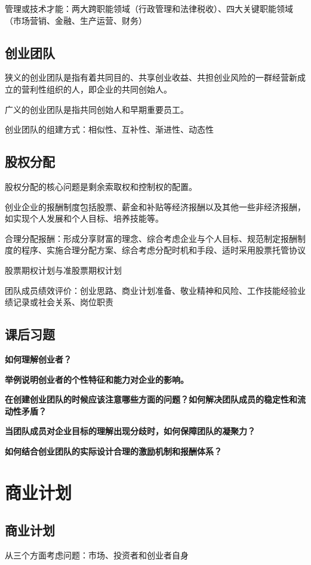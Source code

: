 \documentclass[a4paper, UTF8]{ctexart}
\begin{document}
		管理或技术才能：两大跨职能领域（行政管理和法律税收）、四大关键职能领域（市场营销、金融、生产运营、财务）

	\subsection{创业团队}
		狭义的创业团队是指有着共同目的、共享创业收益、共担创业风险的一群经营新成立的营利性组织的人，即企业的共同创始人。

		广义的创业团队是指共同创始人和早期重要员工。

		创业团队的组建方式：相似性、互补性、渐进性、动态性

	\subsection{股权分配}
		股权分配的核心问题是剩余索取权和控制权的配置。

		创业企业的报酬制度包括股票、薪金和补贴等经济报酬以及其他一些非经济报酬，如实现个人发展和个人目标、培养技能等。

		合理分配报酬：形成分享财富的理念、综合考虑企业与个人目标、规范制定报酬制度的程序、实施合理分配方案、综合考虑分配时机和手段、适时采用股票托管协议

		股票期权计划与准股票期权计划

		团队成员绩效评价：创业思路、商业计划准备、敬业精神和风险、工作技能经验业绩记录或社会关系、岗位职责

	\subsection{课后习题}
		\textbf{如何理解创业者？}

		\textbf{举例说明创业者的个性特征和能力对企业的影响。}

		\textbf{在创建创业团队的时候应该注意哪些方面的问题？如何解决团队成员的稳定性和流动性矛盾？}

		\textbf{当团队成员对企业目标的理解出现分歧时，如何保障团队的凝聚力？}

		\textbf{如何结合创业团队的实际设计合理的激励机制和报酬体系？}

\section{商业计划}
	\subsection{商业计划}
		从三个方面考虑问题：市场、投资者和创业者自身
\end{document}
